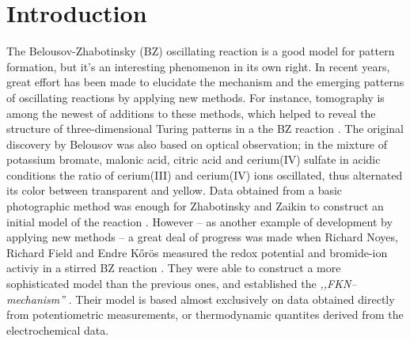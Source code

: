 \documentclass[3p, twocolumn]{elsarticle}
\begin{document}
\section{Introduction}
The Belousov-Zhabotinsky (BZ) oscillating reaction is a good model for pattern formation, but it’s an interesting phenomenon in its own right.
In recent years, great effort has been made to elucidate the mechanism and the emerging patterns of oscillating reactions by applying new methods.
For instance, tomography is among the newest of additions to these methods, which helped to reveal the structure of three-dimensional Turing patterns in a the BZ reaction \cite{bansagi2011}.
The original discovery by Belousov \cite{belousov} was also based on optical observation; in the mixture of potassium bromate, malonic acid, citric acid and cerium(IV) sulfate in acidic conditions the ratio of cerium(III) and cerium(IV) ions oscillated, thus alternated its color between transparent and yellow.
Data obtained from a basic photographic method was enough for Zhabotinsky and Zaikin to construct an initial model of the reaction \cite{zaikin1970}.
However -- as another example of development by applying new methods -- a great deal of progress was made when Richard Noyes, Richard Field and Endre Kőrös measured the redox potential and bromide-ion activiy in a stirred BZ reaction \cite{fkn1}.
They were able to construct a more sophisticated model than the previous ones, and established the \emph{,,FKN--mechanism''} \cite{fkn2}.
Their model is based almost exclusively on data obtained directly from potentiometric measurements, or thermodynamic quantites derived from the electrochemical data.



\end{document}
